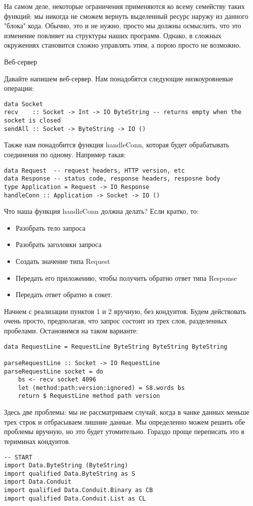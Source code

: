 \begin{verbaim}
На самом деле, некоторые ограничения применяются ко всему семейству таких функций: мы никогда не сможем вернуть выделенный ресурс наружу из данного "блока" кода. Обычно, это и не нужно, просто мы должны осмыслить, что это изменение повлияет на структуры наших программ. Однако, в сложных окружениях становится сложно управлять этим, а порою просто не возможно. 

Веб-сервер

Давайте напишем веб-сервер. Нам понадобятся следующие низкоуровневые операции:
\begin{lstlisting}
data Socket
recv    :: Socket -> Int -> IO ByteString -- returns empty when the socket is closed
sendAll :: Socket -> ByteString -> IO ()
\end{lstlisting}
Также нам понадобится функция handleConn, которая будет обрабатывать соединения по одному. Например такая:
\begin{lstlisting}
data Request  -- request headers, HTTP version, etc
data Response -- status code, response headers, resposne body
type Application = Request -> IO Response
handleConn :: Application -> Socket -> IO ()
\end{lstlisting}
Что наша функция handleConn должна делать? Если кратко, то:
\begin{itemize}  
\item   Разобрать тело запроса
\item   Разобрать заголовки запроса
\item   Создать значение типа Request
\item   Передать его приложению, чтобы получить обратно ответ типа Response
\item   Передать ответ обратно в сокет.
\end{itemize}  
Начнем с реализации пунктов 1 и 2 вручную, без кондуитов. Будем действовать очень просто, предполагая, что запрос состоит из трех слов, разделенных пробелами. Остановимся на таком варианте:
\begin{lstlisting}
data RequestLine = RequestLine ByteString ByteString ByteString

parseRequestLine :: Socket -> IO RequestLine
parseRequestLine socket = do
    bs <- recv socket 4096
    let (method:path:version:ignored) = S8.words bs
    return $ RequestLine method path version
\end{lstlisting}
Здесь две проблемы: мы не рассматриваем случай, когда в чанке данных меньше трех строк и отбрасываем лишние данные. Мы определенно можем решить обе проблемы вручную, но это будет утомительно. Гораздо проще переписать это в териминах кондуитов.
\begin{lstlisting}
-- START
import Data.ByteString (ByteString)
import qualified Data.ByteString as S
import Data.Conduit
import qualified Data.Conduit.Binary as CB
import qualified Data.Conduit.List as CL


\end{lstlisting}
\end{verbaim}
